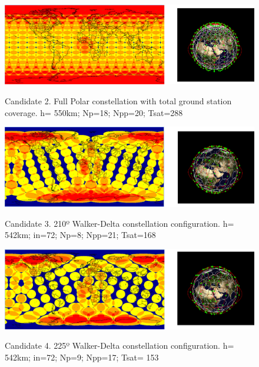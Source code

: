 \begin{figure}%
	\centering
	\includegraphics[width=1\textwidth]{Candidate2.png}\\
	\caption{Candidate 2. Full Polar constellation with total ground station coverage.
			 h= 550km; Np=18; Npp=20; Tsat=288 }
	\label{fig:Candidate2}
\end{figure}

\begin{figure}%
	\centering
	\includegraphics[width=1\textwidth]{Candidate3.png}\\
	\caption{Candidate 3. 210º Walker-Delta constellation configuration.
			 h= 542km; in=72; Np=8; Npp=21; Tsat=168 }
	\label{fig:Candidate3}
\end{figure}

\begin{figure}%
	\centering
	\includegraphics[width=1\textwidth]{Candidate4.png}\\
	\caption{Candidate 4. 225º Walker-Delta constellation configuration.
			 h= 542km; in=72; Np=9; Npp=17; Tsat= 153}
	\label{fig:Candidate4}
\end{figure}

